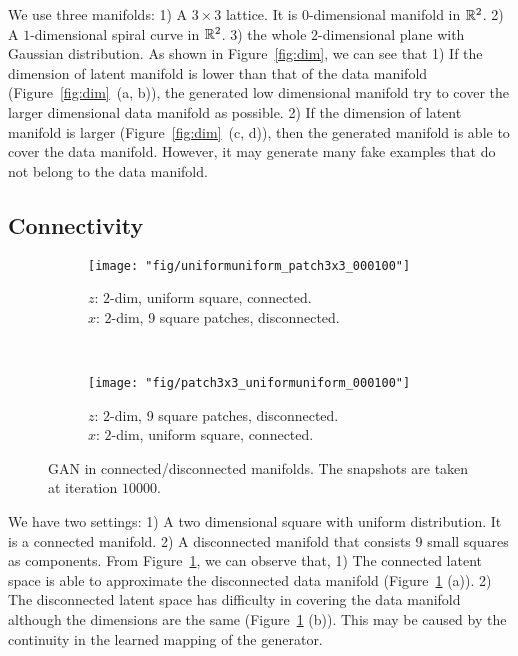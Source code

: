 We use three manifolds:
1) A $3\times3$ lattice. It is $0$-dimensional manifold in ${\mathbb{R}}^2$.
2) A $1$-dimensional spiral curve in ${\mathbb{R}}^2$.
3) the whole $2$-dimensional plane with Gaussian distribution.
As shown in Figure~\ref{fig:dim},
we can see that
1) If the dimension of latent manifold is lower than that of the data manifold
(Figure~\ref{fig:dim}~(a, b)),
the generated low dimensional manifold try to cover the
larger dimensional data manifold as possible.
2) If the dimension of latent manifold is larger (Figure~\ref{fig:dim}~(c, d)),
then the generated manifold is able to cover the data manifold.
However,
it may generate many fake examples that do not belong to the data manifold.

\subsection{Connectivity}

\begin{figure}[ht]
\centering
    \begin{subfigure}[t]{0.45\textwidth}
        \texttt{[image: "fig/uniformuniform\_patch3x3\_000100"]}
        \caption{$z$: $2$-dim, uniform square, connected.\\
            $x$: $2$-dim, 9 square patches, disconnected.}
    \end{subfigure}
    ~
    \begin{subfigure}[t]{0.45\textwidth}
        \texttt{[image: "fig/patch3x3\_uniformuniform\_000100"]}
        \caption{$z$: $2$-dim, 9 square patches, disconnected.\\
            $x$: $2$-dim, uniform square, connected.}
    \end{subfigure}
    \caption{\small
        GAN in connected/disconnected manifolds.
        The snapshots are taken at iteration $10000$.
        }
    \label{fig:conn}
\end{figure}

We have two settings:
1) A two dimensional square with uniform distribution.
It is a connected manifold.
2) A disconnected manifold that consists 9 small squares as components.
From Figure~\ref{fig:conn},
we can observe that,
1) The connected latent space is able to approximate the disconnected
data manifold (Figure~\ref{fig:conn} (a)).
2) The disconnected latent space has difficulty in covering
the data manifold although the dimensions are the same
(Figure~\ref{fig:conn} (b)).
This may be caused by the continuity in the learned mapping
of the generator.
